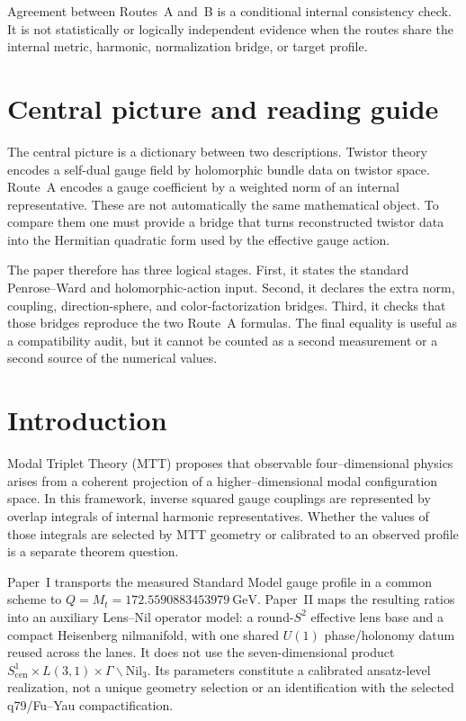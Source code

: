 \documentclass[11pt]{article}
\begin{document}
Agreement between Routes~A and~B is a conditional internal consistency check.
It is not statistically or logically independent evidence when the routes
share the internal metric, harmonic, normalization bridge, or target profile.

\section{Central picture and reading guide}

The central picture is a dictionary between two descriptions. Twistor theory
encodes a self-dual gauge field by holomorphic bundle data on twistor space.
Route~A encodes a gauge coefficient by a weighted norm of an internal
representative. These are not automatically the same mathematical object. To
compare them one must provide a bridge that turns reconstructed twistor data
into the Hermitian quadratic form used by the effective gauge action.

The paper therefore has three logical stages. First, it states the standard
Penrose--Ward and holomorphic-action input. Second, it declares the extra norm,
coupling, direction-sphere, and color-factorization bridges. Third, it checks
that those bridges reproduce the two Route~A formulas. The final equality is
useful as a compatibility audit, but it cannot be counted as a second
measurement or a second source of the numerical values.

\section{Introduction}

Modal Triplet Theory (MTT) proposes that observable four--dimensional physics
arises from a coherent projection of a higher--dimensional modal configuration
space. In this framework, inverse squared gauge couplings are represented by
overlap integrals of internal harmonic representatives. Whether the values of
those integrals are selected by MTT geometry or calibrated to an observed
profile is a separate theorem question.

Paper~I transports the measured Standard Model gauge profile in a common
scheme to $Q=M_t=172.5590883453979~\mathrm{GeV}$. Paper~II maps the resulting
ratios into an auxiliary Lens--Nil operator model: a round-$S^2$ effective
lens base and a compact Heisenberg nilmanifold, with one shared $U(1)$
phase/holonomy datum reused across the lanes. It does not use the
seven-dimensional product
$S^1_{\mathrm{cen}}\times L(3,1)\times
\Gamma\backslash\mathrm{Nil}_3$. Its parameters constitute a calibrated
ansatz-level realization, not a unique geometry selection or an identification
with the selected q79/Fu--Yau compactification.
\end{document}
